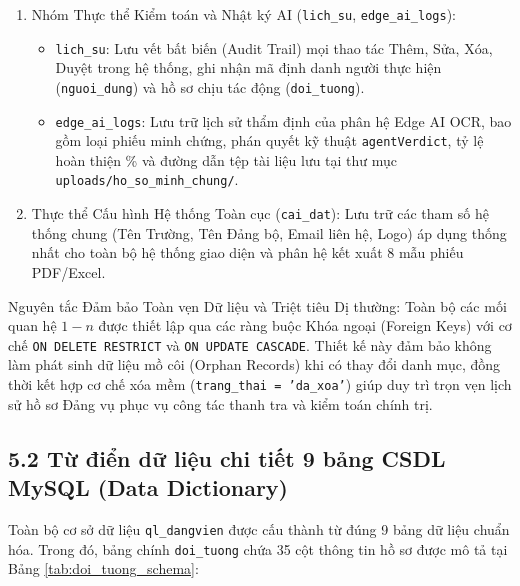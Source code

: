 \documentclass[12pt,a4paper]{report}
\begin{document}
\begin{enumerate}[label=\arabic*.]
\begin{itemize}[label=--,leftmargin=*]
          \item \texttt{dang\_ky\_doi\_tuong}: Đóng vai trò là hàng chờ (Staging Buffer) tiếp nhận đơn đăng ký trực tuyến từ tài khoản \texttt{nguoi\_dung} và chuyển tiếp tới Chi bộ đề xuất. Dữ liệu chỉ được chuyển vào bảng chính thức \texttt{doi\_tuong} sau khi Bí thư Chi bộ thẩm định và phê duyệt.
          \item \texttt{yeu\_cau\_cap\_nhat}: Tiếp nhận các đề xuất thay đổi thông tin cá nhân (SĐT, Email, Lớp, Quê quán) do Quần chúng gửi lên, liên kết trực tiếp với bảng \texttt{doi\_tuong} qua khóa ngoại \texttt{doi\_tuong\_id}. Bảng này cung cấp dữ liệu phục vụ giao diện đối chiếu 2 tab Cũ -- Mới của Bí thư trước khi cập nhật dữ liệu.
        \end{itemize}
  \item Nhóm Thực thể Kiểm toán và Nhật ký AI (\texttt{lich\_su}, \texttt{edge\_ai\_logs}):
        \begin{itemize}[label=--,leftmargin=*]
          \item \texttt{lich\_su}: Lưu vết bất biến (Audit Trail) mọi thao tác Thêm, Sửa, Xóa, Duyệt trong hệ thống, ghi nhận mã định danh người thực hiện (\texttt{nguoi\_dung}) và hồ sơ chịu tác động (\texttt{doi\_tuong}).
          \item \texttt{edge\_ai\_logs}: Lưu trữ lịch sử thẩm định của phân hệ Edge AI OCR, bao gồm loại phiếu minh chứng, phán quyết kỹ thuật \texttt{agentVerdict}, tỷ lệ hoàn thiện \% và đường dẫn tệp tài liệu lưu tại thư mục \texttt{uploads/ho\_so\_minh\_chung/}.
        \end{itemize}
  \item Thực thể Cấu hình Hệ thống Toàn cục (\texttt{cai\_dat}): Lưu trữ các tham số hệ thống chung (Tên Trường, Tên Đảng bộ, Email liên hệ, Logo) áp dụng thống nhất cho toàn bộ hệ thống giao diện và phân hệ kết xuất 8 mẫu phiếu PDF/Excel.
\end{enumerate}

Nguyên tắc Đảm bảo Toàn vẹn Dữ liệu và Triệt tiêu Dị thường:
Toàn bộ các mối quan hệ $1 - n$ được thiết lập qua các ràng buộc Khóa ngoại (Foreign Keys) với cơ chế \texttt{ON DELETE RESTRICT} và \texttt{ON UPDATE CASCADE}. Thiết kế này đảm bảo không làm phát sinh dữ liệu mồ côi (Orphan Records) khi có thay đổi danh mục, đồng thời kết hợp cơ chế xóa mềm (\texttt{trang\_thai = 'da\_xoa'}) giúp duy trì trọn vẹn lịch sử hồ sơ Đảng vụ phục vụ công tác thanh tra và kiểm toán chính trị.

\subsection*{5.2 Từ điển dữ liệu chi tiết 9 bảng CSDL MySQL (Data Dictionary)}
Toàn bộ cơ sở dữ liệu \texttt{ql\_dangvien} được cấu thành từ đúng 9 bảng dữ liệu chuẩn hóa. Trong đó, bảng chính \texttt{doi\_tuong} chứa 35 cột thông tin hồ sơ được mô tả tại Bảng \ref{tab:doi_tuong_schema}:
\end{document}
